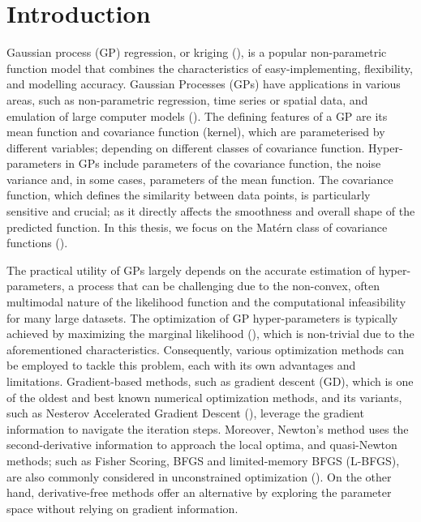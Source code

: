 \chapter{Introduction} 



Gaussian process (GP) regression, or kriging (\cite{eidsvik2011spatial}), is a popular non-parametric function model that combines the characteristics of easy-implementing, flexibility, and modelling accuracy. Gaussian Processes (GPs) have applications in various areas, such as non-parametric regression, time series or spatial data, and emulation of large computer models (\cite{kennedy2001bayesian}). The defining features of a GP are its mean function and covariance function (kernel), which are parameterised by different variables; depending on different classes of covariance function. Hyper-parameters in GPs include parameters of the covariance function, the noise variance and, in some cases, parameters of the mean function. The covariance function, which defines the similarity between data points, is particularly sensitive and crucial; as it directly affects the smoothness and overall shape of the predicted function. In this thesis, we focus on the Mat\'ern class of covariance functions (\cite{williams2006gaussian}). 

The practical utility of GPs largely depends on the accurate estimation of hyper-parameters, a process that can be challenging due to the non-convex, often multimodal nature of the likelihood function and the computational infeasibility for many large datasets. The optimization of GP hyper-parameters is typically achieved by maximizing the marginal likelihood (\cite{williams2006gaussian}), which is non-trivial due to the aforementioned characteristics. Consequently, various optimization methods can be employed to tackle this problem, each with its own advantages and limitations. Gradient-based methods, such as gradient descent (GD), which is one of the oldest and best known numerical optimization methods, and its variants, such as Nesterov Accelerated Gradient Descent (\cite{nesterov2004introductory}), leverage the gradient information to navigate the iteration steps. Moreover, Newton's method uses the second-derivative information to approach the local optima, and quasi-Newton methods; such as Fisher Scoring, BFGS and limited-memory BFGS (L-BFGS), are also commonly considered in unconstrained optimization (\cite{NoceWrig06}). On the other hand, derivative-free methods offer an alternative by exploring the parameter space without relying on gradient information. 

